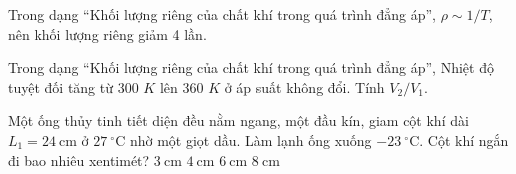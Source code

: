 \begin{bt}
Trong dạng “Khối lượng riêng của chất khí trong quá trình đẳng áp”, $\rho\sim1/T$, nên khối lượng riêng giảm 4 lần.
\end{bt}

\begin{ex}
Trong dạng “Khối lượng riêng của chất khí trong quá trình đẳng áp”, Nhiệt độ tuyệt đối tăng từ 300 $K$ lên 360 $K$ ở áp suất không đổi. Tính $V_2/V_1$.
\end{ex}

\begin{ex}
Một ống thủy tinh tiết diện đều nằm ngang, một đầu kín, giam cột khí dài $L_1 = 24\ \mathrm{cm}$ ở $27\ \mathrm{^\circ C}$ nhờ một giọt dầu. Làm lạnh ống xuống $-23\ \mathrm{^\circ C}$. Cột khí ngắn đi bao nhiêu xentimét?
\choice
{$3\ \mathrm{cm}$}
{\True $4\ \mathrm{cm}$}
{$6\ \mathrm{cm}$}
{$8\ \mathrm{cm}$}
\end{ex}


